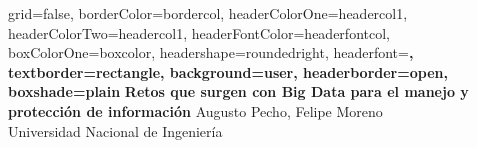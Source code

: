 \documentclass[archE1,portrait]{baposter}
\begin{document}
\background{ %

}

\begin{poster}{
grid=false,
borderColor=bordercol, %
headerColorOne=headercol1, %
headerColorTwo=headercol1, %
headerFontColor=headerfontcol, %
boxColorOne=boxcolor, %
headershape=roundedright, %
headerfont=\Large\sf\bf, %
textborder=rectangle,
background=user,
headerborder=open, %
boxshade=plain
}
{}
%
%
{
\sf\bf Retos que surgen con Big Data para el manejo y protección de información
} %
{\vspace{1em} Augusto Pecho, Felipe Moreno\\ %
{\smaller Universidad Nacional de Ingeniería}\\
} %
%


\end{poster}
\end{document}
